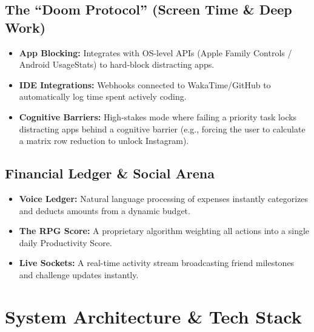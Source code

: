 \documentclass[11pt,oneside]{article}
\begin{document}
\subsection{The ``Doom Protocol'' (Screen Time \& Deep Work)}

\begin{itemize}
  \item \textbf{App Blocking:} Integrates with OS-level APIs (Apple Family Controls / Android UsageStats) to hard-block distracting apps.
  
  \item \textbf{IDE Integrations:} Webhooks connected to WakaTime/GitHub to automatically log time spent actively coding.
  
  \item \textbf{Cognitive Barriers:} High-stakes mode where failing a priority task locks distracting apps behind a cognitive barrier (e.g., forcing the user to calculate a matrix row reduction to unlock Instagram).
\end{itemize}

\subsection{Financial Ledger \& Social Arena}

\begin{itemize}
  \item \textbf{Voice Ledger:} Natural language processing of expenses instantly categorizes and deducts amounts from a dynamic budget.
  
  \item \textbf{The RPG Score:} A proprietary algorithm weighting all actions into a single daily Productivity Score.
  
  \item \textbf{Live Sockets:} A real-time activity stream broadcasting friend milestones and challenge updates instantly.
\end{itemize}

\section{System Architecture \& Tech Stack}
\end{document}
